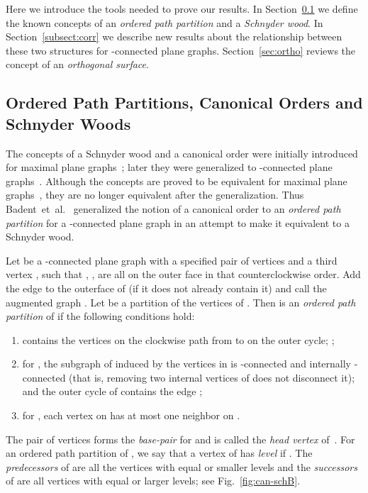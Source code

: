 \documentclass{article}
\newcommand{\df}{\textit}
\begin{document}
Here we introduce the tools needed to prove our results. In Section~\ref{subsect:def} we define
the known concepts of an \df{ordered path partition} and a \df{Schnyder wood}. In Section~\ref{subsect:corr} we describe new results about the relationship between these two structures for  -connected plane graphs. Section~\ref{sec:ortho} reviews the concept of an \df{orthogonal surface}.

\subsection{Ordered Path Partitions, Canonical Orders and Schnyder Woods}
\label{subsect:def}

The concepts of a Schnyder wood and a canonical order
were initially introduced for maximal plane graphs~\cite{FPP90,Sch90}; later they were generalized
 to -connected plane graphs~\cite{Kan96,FZ08}.
Although the concepts are proved to be equivalent for maximal plane graphs~\cite{FM01},
 they are no longer equivalent after the generalization. Thus Badent~et~al.~\cite{BBC11}
 generalized the notion of a canonical order to an {\em ordered path partition} for a -connected
 plane graph in an attempt to make it equivalent to a Schnyder wood.


Let  be a -connected plane graph with a specified pair of vertices  and a third vertex
, such that , ,  are all on the outer face in that counterclockwise
order. Add the edge  to the outerface of  (if it does not already contain it) and call the augmented graph
. Let  be a partition of the vertices of .
Then  is an \df{ordered path partition} of  if the following conditions hold:


\begin{enumerate}[(1)]


	\item  contains the vertices on the clockwise path from  to  on the outer
		cycle;
		;
	\item for , the subgraph  of  induced by the vertices in
		 is -connected and internally -connected
		(that is, removing two internal vertices of  does not disconnect it); and
		the outer cycle  of  contains the edge ;

	\item for , each vertex on  has at most one neighbor on .
\end{enumerate}

The pair of vertices  forms the \df{base-pair} for  and  is called the \df{head vertex}
of~.
For an ordered path partition  of , we say that a vertex  of  has
\df{level}  if . The \df{predecessors} of  are all the vertices with equal or smaller levels
and the \df{successors} of  are all vertices with equal or larger levels; see Fig.~\ref{fig:can-schB}.
\end{document}
